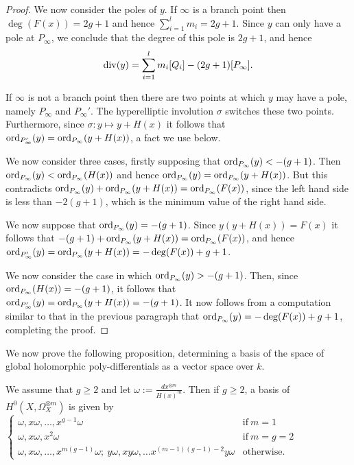 \begin{proof}
    We now consider the poles of $y$.
    If $\infty$ is a branch point then $\deg(F(x)) = 2g+1$ and hence $\sum_{i=1}^l m_i = 2g+1$.
    Since $y$ can only have a pole at $P_\infty$, we conclude that the degree of this pole is $2g+1$, and hence
        \[
        \operatorname{div}(y) = \sum_{i=1}^l m_i [Q_i] - (2g+1)[P_\infty].
        \]
    
    If $\infty$ is not a branch point then there are two points at which $y$ may have a pole, namely $P_\infty$ and $P_\infty'$.
    The hyperelliptic involution $\sigma$ switches these two points.
    Furthermore, since $\sigma \colon y \mapsto y+H(x)$ it follows that $\operatorname{ord}_{P_\infty'}(y) = \operatorname{ord}_{P_ \infty}(y+H(x))$, a fact we use below.
    
    
    We now consider three cases, firstly supposing that $\operatorname{ord}_{P_\infty}(y) < -(g+1)$.
    Then $\operatorname{ord}_{P_\infty}(y) < \operatorname{ord}_{P_\infty}(H(x))$ and hence $ \operatorname{ord}_{P_\infty}(y) = \operatorname{ord}_{P_\infty}(y+H(x))$.
    But this contradicts $\operatorname{ord}_{P_\infty}(y) + \operatorname{ord}_{P_\infty}(y+H(x)) = \operatorname{ord}_{P_\infty}(F(x))$, since the left hand side is less than $-2(g+1)$, which is the minimum value of the right hand side.
    
    We now suppose that $\operatorname{ord}_{P_\infty} (y) = -(g+1)$. Since $y(y+H(x)) = F(x)$ it follows that $-(g+1) + \operatorname{ord}_{P_\infty}(y+H(x)) = \operatorname{ord}_{P_\infty}(F(x))$, and hence $\operatorname{ord}_{P_\infty'}(y) = \operatorname{ord}_{P_\infty}(y+H(x)) = -\deg(F(x)) + g + 1$.
    
    We now consider the case in which $\operatorname{ord}_{P_\infty}(y) > -(g+1)$.
    Then, since $\operatorname{ord}_{P_\infty}(H(x)) = -(g+1)$, it follows that $\operatorname{ord}_{P_\infty'}(y) = \operatorname{ord}_{P_\infty} (y+H(x)) = -(g+1)$.
    It now follows from a computation similar to that in the previous paragraph that $\operatorname{ord}_{P_\infty}(y) = -\deg(F(x)) + g +1$, completing the proof.
    \end{proof}

We now prove the following proposition, determining a basis of the space of global holomorphic poly-differentials as a vector space over $k$.

    \begin{prop}\label{propbasishyperellipticp=2}
    We assume that $g\geq 2$ and let $\omega:= \frac{dx^{\otimes m}}{H(x)^m}$. 
    Then if $g\geq 2$, a basis of $H^0(X,\Omega_X^{\otimes m})$ is given by
        $\begin{cases}
        \omega, x\omega, \ldots , x^{g-1}\omega &  \mbox{if}\ m=1 \\
        \omega, x\omega, x^2\omega & \mbox{if}\ m=g=2 \\
        \omega, x\omega, \ldots, x^{m(g-1)}\omega;\  y\omega, xy\omega, \ldots x^{(m-1)(g-1)-2}y\omega & \mbox{otherwise.}
        \end{cases}$
    \end{prop}
    
